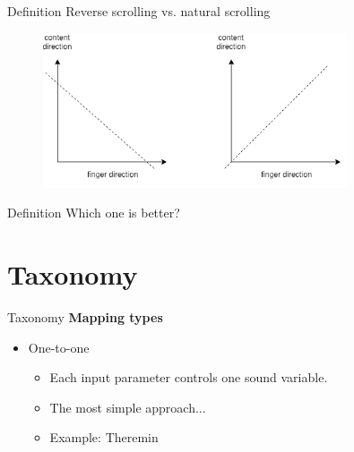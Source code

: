 \documentclass{beamer}
\begin{document}
\begin{frame}{Definition}
    Reverse scrolling vs. natural scrolling
        \begin{figure}[h]
        \includegraphics[width=0.8\textwidth]{scrolling_mapping.png}
    \end{figure}
\end{frame}

\begin{frame}{Definition}
    Which one is better?
\end{frame}

\section{Taxonomy}

\begin{frame}{Taxonomy}
    \textbf{Mapping types}\\
    \vspace{5mm}
    \begin{itemize}
        \item One-to-one
        \begin{itemize}
            \item Each input parameter controls one sound variable.
            \item The most simple approach...
            \item Example: Theremin
         \end{itemize}
    \end{itemize}
\end{frame}
\end{document}
